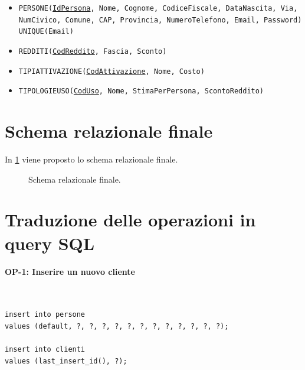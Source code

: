 \documentclass[a4paper,12pt]{report}
\begin{document}
\begin{itemize}
    \item \texttt{PERSONE(\underline{IdPersona}, Nome, Cognome, CodiceFiscale, DataNascita, Via, NumCivico, Comune, CAP, Provincia, NumeroTelefono, Email, Password) \\
    UNIQUE(Email)}
    
    \item \texttt{REDDITI(\underline{CodReddito}, Fascia, Sconto)}
    
    \item \texttt{TIPI\textunderscore ATTIVAZIONE(\underline{CodAttivazione}, Nome, Costo)}
    
    \item \texttt{TIPOLOGIE\textunderscore USO(\underline{CodUso}, Nome, StimaPerPersona, ScontoReddito)}
\end{itemize}

\section{Schema relazionale finale}
In \cref{fig:full-relational} viene proposto lo schema relazionale finale.

\begin{figure}
\centering{}
\caption{Schema relazionale finale.}
\label{fig:full-relational}
\end{figure}
\newpage
\section{Traduzione delle operazioni in query SQL}
\paragraph{OP-1: Inserire un nuovo cliente}\mbox{}\\
\begin{lstlisting}
insert into persone
values (default, ?, ?, ?, ?, ?, ?, ?, ?, ?, ?, ?, ?);

insert into clienti
values (last_insert_id(), ?);
\end{lstlisting}
\end{document}
